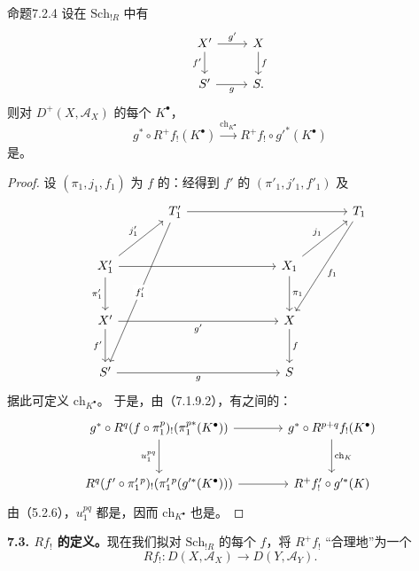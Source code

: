 \begin{SGAresult}{命题}{7.2.4}
设在 $\mathrm{Sch}_{!R}$ 中有
\[
\begin{tikzcd}
X'\arrow[r,"g'"]\arrow[d,"f'"']&X\arrow[d,"f"]\\
S'\arrow[r,"g"']&S.
\end{tikzcd}
\]
则对 $D^+(X,\mathscr A_X)$ 的每个 $K^\bullet$，
\[g^*\circ R^+f_!(K^\bullet)\xrightarrow{\mathrm{ch}_{K^\bullet}}R^+f_!\circ g'^*(K^\bullet)\]
是。
\end{SGAresult}
\begin{proof}
设 $(\pi_1,j_1,f_1)$ 为 $f$ 的：经得到 $f'$ 的 $(\pi'_1,j'_1,f'_1)$ 及
\[
\begin{tikzcd}[column sep=large,row sep=large]
&T'_1\arrow[rrr]\arrow[dddl,"f'_1" description]&&&T_1\arrow[ddl,"f_1"]\\
X'_1\arrow[ur,"j'_1"]\arrow[rrr]\arrow[d,"\pi'_1"']&&&X_1\arrow[ur,"j_1"]\arrow[d,"\pi_1"]&\\
X'\arrow[rrr,"g'"']\arrow[d,"f'"']&&&X\arrow[d,"f"]&\\
S'\arrow[rrr,"g"']&&&S&
\end{tikzcd}
\]
据此可定义 $\mathrm{ch}_{K^\bullet}$。
于是，由（7.1.9.2），有之间的：
\[
\begin{tikzcd}[column sep=large,row sep=large]
g^*\circ R^q(f\circ\pi_1^p)_!(\pi_1^{p*}(K^\bullet))\arrow[r]\arrow[d,"u_1^{pq}"']&g^*\circ R^{p+q}f_!(K^\bullet)\arrow[d,"\mathrm{ch}_K"]\\
R^q(f'\circ\pi_1'{}^p)_!(\pi_1'{}^{p}(g'^*(K^\bullet)))\arrow[r]&R^+f'_!\circ g'^*(K)
\end{tikzcd}
\]
由（5.2.6），$u_1^{pq}$ 都是，因而 $\mathrm{ch}_{K^\bullet}$ 也是。
\end{proof}

\textbf{7.3. $Rf_!$ 的定义。}现在我们拟对 $\mathrm{Sch}_{!R}$ 的每个 $f$，将 $R^+f_!$ “合理地”为一个
\[Rf_!:D(X,\mathscr A_X)\longrightarrow D(Y,\mathscr A_Y).\]

